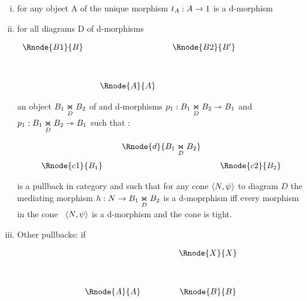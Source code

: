 \documentclass[10pt,a4paper]{article}
\begin{document}
\begin{enumerate} [(i)]
	\item for any object A of  the unique morphism $t_A:A \morph 1$ is a d-morphism
	
	
	\item for all diagrams D of d-morphisms \begin{center}
$
\begin{array}{cp{0cm}cp{0cm}c}
\Rnode{B1}{B}& &            &  &\Rnode{B2}{B'} \\ [1.2cm]
               & &\Rnode{A}{A}& &
\end{array}
$
\end{center}
	
an object  $ \fibrex{B_1}{B_2}{D}$ of  and d-morphisms 
$p_1: \fibrex{B_1}{B_2}{D} \dmorph B_1$ and  $p_1: \fibrex{B_1}{B_2}{D} \dmorph B_1$ such that :

\begin{center}
\begin{displaymath}
\begin{array}{cp{0.1cm}cp{0.1cm} c}
            & &\Rnode{d}{\fibrex{B_1}{B_2}{D}}                  \\ [0.4cm]
\Rnode{c1}{B_1}& &                & & \Rnode{c2}{B_2} 
\end{array}
\end{displaymath}
\end{center}

is a pullback in category  and such that for any 
cone $\tuple{N,\psi}$ to diagram $D$
the mediating morphism $h: N \morph B_1 \underset{D}{\Join} B_2$ is a d-moprphism iff 
every morphism in the cone \ $\tuple{N,\psi}$ is a d-morphism and the cone is tight.

	\item Other pullbacks: if
\begin{center}
\begin{displaymath}
\begin{array}{cp{.9cm}c}
            & & \Rnode{X}{X} \\ [1.2cm]
\Rnode{A}{A}& & \Rnode{B}{B} \\
\end{array}
\end{displaymath}
\end{center}


\end{enumerate}
\end{document}
